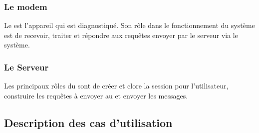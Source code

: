 \subsubsection*{Le modem}
Le \md est l'appareil qui est diagnostiqué. Son rôle dans le fonctionnement du système est de recevoir, traiter et répondre aux requêtes envoyer par le serveur via le système.

\subsubsection*{Le Serveur}
Les principaux rôles du \sv sont de créer et clore la session pour l'utilisateur, construire les requêtes à envoyer au \md et envoyer les messages.

\subsection{Description des cas d'utilisation}

